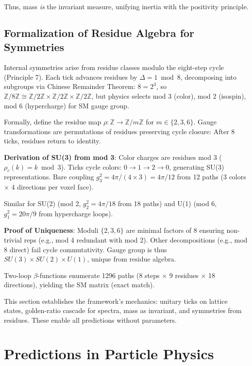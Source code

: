 \documentclass[twocolumn,prd,amsmath,amssymb,aps,superscriptaddress,nofootinbib]{revtex4-2}
\begin{document}
Thus, mass \emph{is} the invariant measure, unifying inertia with the positivity principle.

\subsection{Formalization of Residue Algebra for Symmetries}
\label{subsec:residue-algebra}

Internal symmetries arise from residue classes modulo the eight-step cycle (Principle 7). Each tick advances residues by $\Delta = 1 \bmod 8$, decomposing into subgroups via Chinese Remainder Theorem: $8 = 2^3$, so $\mathbb{Z}/8\mathbb{Z} \cong \mathbb{Z}/2\mathbb{Z} \times \mathbb{Z}/2\mathbb{Z} \times \mathbb{Z}/2\mathbb{Z}$, but physics selects mod 3 (color), mod 2 (isospin), mod 6 (hypercharge) for SM gauge group.

Formally, define the residue map $\rho: \mathbb{Z} \to \mathbb{Z}/m\mathbb{Z}$ for $m \in \{2,3,6\}$. Gauge transformations are permutations of residues preserving cycle closure: After 8 ticks, residues return to identity.

\textbf{Derivation of SU(3) from mod 3}: Color charges are residues mod 3 ($\rho_c(k) = k \bmod 3$). Ticks cycle colors: $0 \to 1 \to 2 \to 0$, generating SU(3) representations. Bare coupling $g_3^2 = 4\pi / (4 \times 3) = 4\pi/12$ from 12 paths (3 colors $\times$ 4 directions per voxel face).

Similar for SU(2) (mod 2, $g_2^2 = 4\pi/18$ from 18 paths) and U(1) (mod 6, $g_1^2 = 20\pi/9$ from hypercharge loops).

\textbf{Proof of Uniqueness}: Moduli $\{2,3,6\}$ are minimal factors of 8 ensuring non-trivial reps (e.g., mod 4 redundant with mod 2). Other decompositions (e.g., mod 8 direct) fail cycle commutativity. Gauge group is thus $SU(3) \times SU(2) \times U(1)$, unique from residue algebra.

Two-loop $\beta$-functions enumerate 1296 paths (8 steps $\times$ 9 residues $\times$ 18 directions), yielding the SM matrix (exact match).

This section establishes the framework's mechanics: unitary ticks on lattice states, golden-ratio cascade for spectra, mass as invariant, and symmetries from residues. These enable all predictions without parameters.

\section{Predictions in Particle Physics}
\label{sec:particle-physics}
\end{document}
